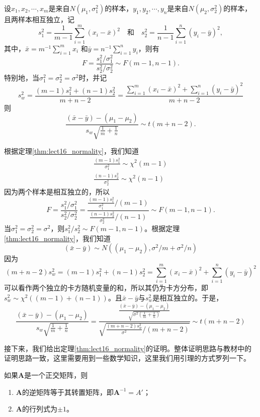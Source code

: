 \begin{example}
    设$x_1,x_2,\cdots,x_m$是来自$N(\mu_1,\sigma^2_1)$的样本，$y_1,y_2,\cdots,y_n$是来自$N(\mu_2,\sigma^2_2)$的样本，且两样本相互独立，记
$$
s_1^2 = \frac{1}{m-1}\sum_{i=1}^m (x_i-\bar{x})^2 \quad \text{和}\quad 
s_2^2 = \frac{1}{n-1}\sum_{i=1}^n (y_i-\bar{y})^2,
$$
其中，$\bar{x} = m^{-1}\sum_{i=1}^m x_i$ 和$\bar{y}=n^{-1}\sum_{i=1}^n y_i$，则有
$$
F = \frac{s_1^2 / \sigma_1^2}{s_2^2 /\sigma_2^2} \sim F(m-1,n-1).
$$
特别地，当$\sigma_1^2 = \sigma_2^2 =\sigma^2$时，并记
$$
s_w^2 = \frac{(m-1)s_1^2 + (n-1)s_2^2}{m+n -2} = \frac{\sum_{i=1}^m(x_i-\bar{x})^2 + \sum_{i=1}^n(y_i-\bar{y})^2}{m+n -2}
$$
则$$
\frac{(\bar{x} -\bar{y}) - (\mu_1 - \mu_2)}{s_w \sqrt{\frac{1}{m} + \frac{1}{n}}} \sim t(m+n-2).
$$
\end{example}
\begin{solution}
    根据定理\ref{thm:lect16_normality}，我们知道
    \begin{eqnarray*}
        \frac{(m-1) s_1^2}{\sigma_1^2} \sim \chi^2(m-1)\\
         \frac{(n-1) s_2^2}{\sigma_2^2} \sim \chi^2(n-1)
    \end{eqnarray*}
    因为两个样本是相互独立的，所以
    $$
    F = \frac{s_1^2/\sigma_1^2}{s_2^2/\sigma_2^2} = \frac{\frac{(m-1) s_1^2}{\sigma_1^2}/(m-1)}{\frac{(n-1) s_2^2}{\sigma_2^2}/(n-1)} \sim F(m-1,n-1).
    $$
    当$\sigma_1^2=\sigma_2^2 =\sigma^2$，则$s_1^2/s_2^2 \sim F(m-1,n-1)$。根据定理\ref{thm:lect16_normality}，我们知道
    $$
    (\bar{x}-\bar{y}) \sim N((\mu_1 - \mu_2),\sigma^2/m + \sigma^2/n)
    $$
    因为
    $$
   (m+n-2) s_w^2 =  (m-1)s_1^2 + (n-1)s_2^2 = \sum_{i=1}^m(x_i-\bar{x})^2 + \sum_{i=1}^n(y_i-\bar{y})^2
    $$
    可以看作两个独立的卡方随机变量的和，所以其仍为卡方分布，即$s_w^2 \sim \chi^2((m-1)+(n-1))$。且$\bar{x} - \bar{y}$与$s_w^2$是相互独立的。于是，
    $$
    \frac{(\bar{x} -\bar{y}) - (\mu_1 - \mu_2)}{s_w \sqrt{\frac{1}{m} + \frac{1}{n}}} = \frac{\frac{(\bar{x} -\bar{y}) - (\mu_1 - \mu_2)}{ \sqrt{\sigma^2\left(\frac{1}{m} + \frac{1}{n}\right)}} }{\sqrt{\frac{(m+n-2) s_w^2}{\sigma^2}/(m+n-2)}}
    \sim t(m+n-2)$$ 
\end{solution}

接下来，我们给出定理\ref{thm:lect16_normality}的证明。整体证明思路与教材中的证明思路一致，这里需要用到一些数学知识，这里我们用引理的方式罗列一下。
\begin{lemma}
  如果$\bm{A}$是一个正交矩阵，则
        \begin{enumerate}
            \item $\bm{A}$的逆矩阵等于其转置矩阵，即$\bm{A}^{-1} = A'$；
            \item $\bm{A}$的行列式为$\pm 1$。
        \end{enumerate}
\end{lemma}

